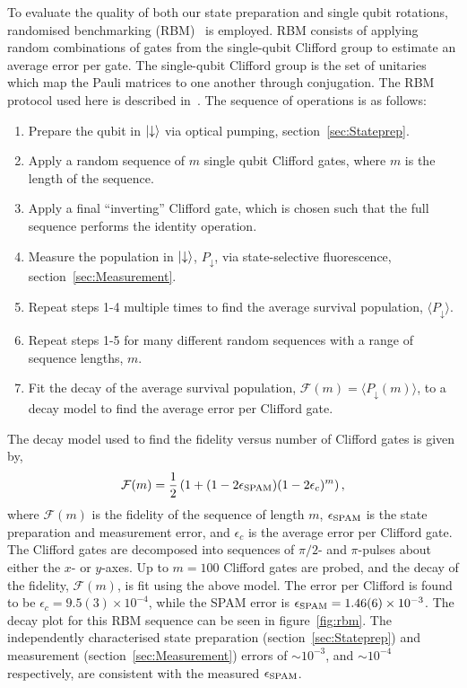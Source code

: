     To evaluate the quality of both our
    state preparation and single qubit rotations, randomised benchmarking
    (RBM)~\cite{knill2008randomized} is employed.  RBM consists of
    applying random combinations of gates from the single-qubit Clifford group to
    estimate an average error per gate. The single-qubit Clifford group is
    the set of unitaries which map the Pauli matrices to one another through
    conjugation. The RBM protocol used here is described in~\cite{hughes2021benchmarking}.
    The sequence of operations is as follows:
    \begin{enumerate}
        \item Prepare the qubit in $\ket{\downarrow}$ via optical pumping, section~\ref{sec:Stateprep}.
        \item Apply a random sequence of $m$ single qubit Clifford gates, where $m$ is the length of the sequence.
        \item Apply a final ``inverting'' Clifford gate, which is chosen such that the full sequence performs the identity operation.
        \item Measure the population in $\ket{\downarrow}$, $P_\downarrow$, via state-selective fluorescence, section~\ref{sec:Measurement}.
        \item Repeat steps 1-4 multiple times to find the average survival population, $\langle P_\downarrow \rangle$.
        \item Repeat steps 1-5 for many different random sequences with a range of sequence lengths, $m$.
        \item Fit the decay of the average survival population, $\mathcal{F}(m) = \langle P_\downarrow(m) \rangle$, to a decay model to find the average error per Clifford gate.
    \end{enumerate}
    The decay model used to find 
    the fidelity versus number of Clifford gates is given by\cite{hughes2021benchmarking},
    \begin{equation}
    \label{eq:RBM_decay}
        \mathcal{F}(m) = \frac{1}{2}\left( 1+(1-2\epsilon_{\rm SPAM})(1-2\epsilon_c)^m\right),
    \end{equation}
    where $\mathcal{F}(m)$ is the fidelity of the sequence of length $m$,
    $\epsilon_{\rm SPAM}$ is the state preparation and measurement error, and
    $\epsilon_c$ is the average error per Clifford gate.  The Clifford gates are decomposed into
    sequences of $\pi/2$- and $\pi$-pulses about either the $x$- or $y$-axes. Up to $m=100$ Clifford gates are probed, and the decay of the fidelity, $\mathcal{F}(m)$, is fit using the above model.
    The error per Clifford is found to be $\epsilon_c = 9.5(3) \times 10^{-4}$,
    while the SPAM error is $\epsilon_{\rm SPAM} = 1.46(6) \times 10^{-3}$. The decay plot for
    this RBM sequence can be seen in figure~\ref{fig:rbm}.
    The independently characterised state preparation (section~\ref{sec:Stateprep}) and measurement (section~\ref{sec:Measurement}) errors of $\sim 10^{-3}$, and $\sim 10^{-4}$ respectively, are consistent with the measured $\epsilon_{\rm SPAM}$.


